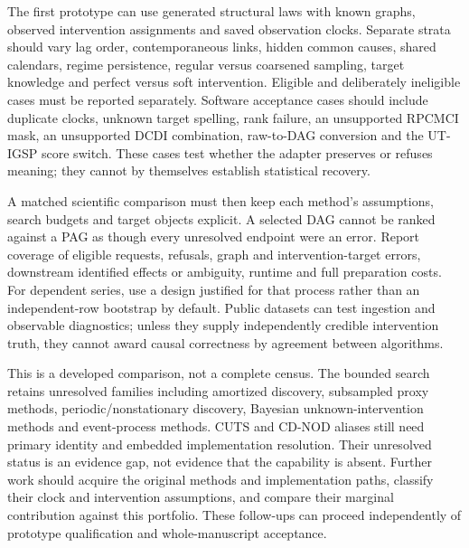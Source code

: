 The first prototype can use generated structural laws with known graphs,
observed intervention assignments and saved observation clocks. Separate
strata should vary lag order, contemporaneous links, hidden common causes,
shared calendars, regime persistence, regular versus coarsened sampling,
target knowledge and perfect versus soft intervention. Eligible and
deliberately ineligible cases must be reported separately. Software
acceptance cases should include duplicate clocks, unknown target spelling,
rank failure, an unsupported RPCMCI mask, an unsupported DCDI combination,
raw-to-DAG conversion and the UT-IGSP score switch. These cases test whether
the adapter preserves or refuses meaning; they cannot by themselves establish
statistical recovery.\citep{exec14_pt_contract,exec14_pt_exact}

A matched scientific comparison must then keep each method's assumptions,
search budgets and target objects explicit. A selected DAG cannot be ranked
against a PAG as though every unresolved endpoint were an error. Report
coverage of eligible requests, refusals, graph and intervention-target errors,
downstream identified effects or ambiguity, runtime and full preparation
costs. For dependent series, use a design justified for that process rather
than an independent-row bootstrap by default. Public datasets can test
ingestion and observable diagnostics; unless they supply independently
credible intervention truth, they cannot award causal correctness by
agreement between algorithms.\citep{exec14_pt_contract}

This is a developed comparison, not a complete census. The bounded search
retains unresolved families including amortized discovery, subsampled
proxy methods, periodic/nonstationary discovery, Bayesian unknown-intervention
methods and event-process methods. CUTS and CD-NOD aliases still need
primary identity and embedded implementation resolution. Their unresolved
status is an evidence gap, not evidence that the capability is absent.
Further work should acquire the original methods and implementation paths,
classify their clock and intervention assumptions, and compare their marginal
contribution against this portfolio. These follow-ups can proceed independently
of prototype qualification and whole-manuscript acceptance.
\citep{exec14_pt_contract}
\label{exec14:python-temporal-end}
